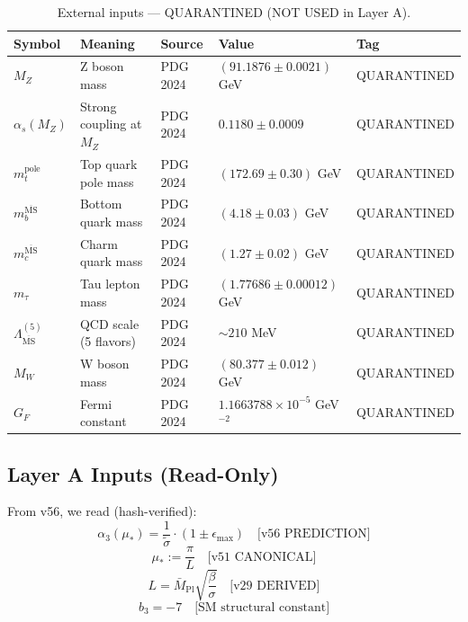 \documentclass[11pt,a4paper]{article}
\theoremstyle{definition}
\begin{document}
\begin{table}[ht]
\centering
\caption{External inputs --- QUARANTINED (NOT USED in Layer A).}
\label{tab:external-inputs}
\begin{tabular}{lllll}
\toprule
Symbol & Meaning & Source & Value & Tag \\
\midrule
$M_Z$ & Z boson mass & PDG 2024 & $(91.1876 \pm 0.0021)$ GeV & QUARANTINED \\
$\alpha_s(M_Z)$ & Strong coupling at $M_Z$ & PDG 2024 & $0.1180 \pm 0.0009$ & QUARANTINED \\
$m_t^{\text{pole}}$ & Top quark pole mass & PDG 2024 & $(172.69 \pm 0.30)$ GeV & QUARANTINED \\
$m_b^{\overline{\text{MS}}}$ & Bottom quark mass & PDG 2024 & $(4.18 \pm 0.03)$ GeV & QUARANTINED \\
$m_c^{\overline{\text{MS}}}$ & Charm quark mass & PDG 2024 & $(1.27 \pm 0.02)$ GeV & QUARANTINED \\
$m_\tau$ & Tau lepton mass & PDG 2024 & $(1.77686 \pm 0.00012)$ GeV & QUARANTINED \\
$\Lambda_{\overline{\text{MS}}}^{(5)}$ & QCD scale (5 flavors) & PDG 2024 & $\sim 210$ MeV & QUARANTINED \\
$M_W$ & W boson mass & PDG 2024 & $(80.377 \pm 0.012)$ GeV & QUARANTINED \\
$G_F$ & Fermi constant & PDG 2024 & $1.1663788 \times 10^{-5}$ GeV$^{-2}$ & QUARANTINED \\
\bottomrule
\end{tabular}
\end{table}

\subsection{Layer A Inputs (Read-Only)}
\label{subsec:layer-a-inputs}

From v56, we read (hash-verified):
\begin{equation}
\label{eq:layer-a-input-1}
\alpha_3(\mu_*) = \frac{1}{\tilde{\sigma}} \cdot (1 \pm \epsilon_{\max})
  \quad \text{[v56 PREDICTION]}
\end{equation}
\begin{equation}
\label{eq:layer-a-input-2}
\mu_* := \frac{\pi}{L} \quad \text{[v51 CANONICAL]}
\end{equation}
\begin{equation}
\label{eq:layer-a-input-3}
L = \bar{M}_{\text{Pl}} \sqrt{\frac{\beta}{\sigma}} \quad \text{[v29 DERIVED]}
\end{equation}
\begin{equation}
\label{eq:layer-a-input-4}
b_3 = -7 \quad \text{[SM structural constant]}
\end{equation}
\end{document}
